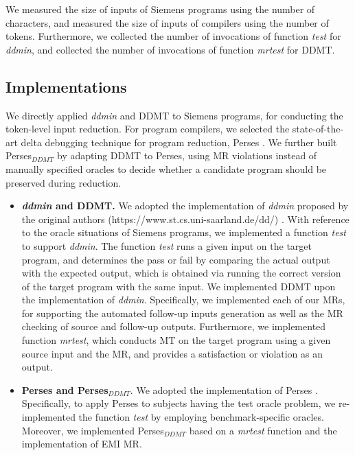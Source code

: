 We measured the size of inputs of Siemens programs using the number of characters, and measured the size of inputs of compilers using the number of tokens.
Furthermore, we collected the number of invocations of function \emph{test} for \emph{ddmin}, and collected the number of invocations of function \emph{mrtest} for DDMT.


\subsection{Implementations}


We directly applied \emph{ddmin} and DDMT to Siemens programs, for conducting the token-level input reduction.
For program compilers, we selected the state-of-the-art delta debugging technique for program reduction, Perses \cite{Sun2018}.
We further built Perses$_{DDMT}$ by adapting DDMT to Perses, using MR violations instead of manually specified oracles to decide whether a candidate program should be preserved during reduction.

\begin{itemize}
	\item \textbf{\emph{ddmin} and DDMT.} 
	We adopted the implementation of \emph{ddmin} proposed by the original authors (https://www.st.cs.uni-saarland.de/dd/) \cite{Zeller2002}. 
	With reference to the oracle situations of Siemens programs, we implemented a function \emph{test} to support \emph{ddmin}.
	The function \emph{test} runs a given input on the target program, and determines the pass or fail by comparing the actual output with the expected output, which is obtained via running the correct version of the target program with the same input.
	We implemented DDMT upon the implementation of \emph{ddmin}.
	Specifically, we implemented each of our MRs, for supporting the automated follow-up inputs generation as well as the MR checking of source and follow-up outputs.
	Furthermore, we implemented function \emph{mrtest}, which conducts MT on the target program using a given source input and the MR, and provides a satisfaction or violation as an output.

\item \textbf{Perses and Perses$_{DDMT}$}. 
        We adopted the implementation of Perses \cite{Sun2018}.
        Specifically, to apply Perses to subjects having the test oracle problem, we re-implemented the function \emph{test} by employing benchmark-specific oracles.
        Moreover, we implemented Perses$_{DDMT}$ based on a \emph{mrtest} function and the implementation of EMI MR.
	

\end{itemize}


